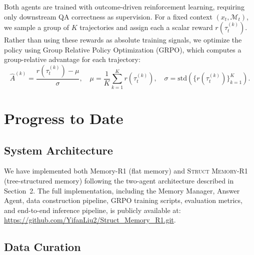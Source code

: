 \documentclass{article}
\theoremstyle{definition}
\begin{document}
 Both agents are trained with outcome-driven reinforcement learning, requiring only downstream QA correctness as supervision.
 For a fixed context $(x_t, \mathcal{M}_t)$, we sample a group of $K$ trajectories and assign each a scalar reward $r(\tau_t^{(k)})$. Rather than using these rewards as absolute training signals, we optimize the policy using Group Relative Policy Optimization (GRPO), which computes a group-relative advantage for each trajectory:
\begin{equation}
\hat{A}^{(k)} = \frac{r(\tau_t^{(k)}) - \mu}{\sigma}, \quad \mu = \frac{1}{K}\sum_{k=1}^{K} r(\tau_t^{(k)}), \quad \sigma = \mathrm{std}\!\left(\{r(\tau_t^{(k)})\}_{k=1}^{K}\right).
\end{equation}



\section{Progress to Date}

\subsection{System Architecture}

We have implemented both Memory-R1 (flat memory) and \textsc{Struct Memory-R1} (tree-structured memory) following the two-agent architecture described in Section~2. The full implementation, including the Memory Manager, Answer Agent, data construction pipeline, GRPO training scripts, evaluation metrics, and end-to-end inference pipeline, is publicly available at: \url{https://github.com/YifanLiu2/Struct_Memory_R1.git}.


\subsection{Data Curation}
\end{document}
